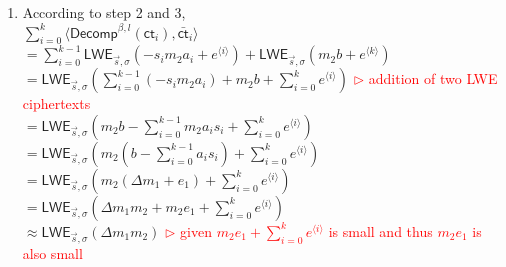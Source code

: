 \begin{myproof}
\begin{enumerate}
$\gap{$\cdots$} + \textsf{LWE}_{\vec{s}, \sigma}\left(-a_{\langle i, l\rangle}s_im_2\dfrac{q}{\beta^l} + a_{\langle i, l \rangle}e_{i,l}\right)\Bigg)$ \\
$= \sum\limits_{i=0}^{k-1}\textsf{LWE}_{\vec{s}, \sigma}\left(-a_{\langle i, 1\rangle}s_im_2\dfrac{q}{\beta^1} -a_{\langle i, 2\rangle}s_im_2\dfrac{q}{\beta^2} + \gap{$\cdots$} -a_{\langle i, l\rangle}s_im_2\dfrac{q}{\beta^l} + a_{\langle i, 1 \rangle}e_{i,1} + \cdots + a_{\langle i, l \rangle}e_{i,l}\right)$ \\
$= \sum\limits_{i=0}^{k-1}\textsf{LWE}_{\vec{s}, \sigma}\left(-s_im_2 \cdot \left(a_{\langle i, 1\rangle}\dfrac{q}{\beta^1} + a_{\langle i, 2\rangle}\dfrac{q}{\beta^2} + \gap{$\cdots$} + a_{\langle i, l\rangle}\dfrac{q}{\beta^l}\right) + a_{\langle i, 1 \rangle}e_{i,1} + \cdots + a_{\langle i, l \rangle}e_{i,l}\right)$ \\
$= \sum\limits_{i=0}^{k-1}\textsf{LWE}_{\vec{s}, \sigma}(-s_im_2a_i + e^{\langle i \rangle})$ \textcolor{red}{ $\rhd$ where $e^{\langle i \rangle} = a_{\langle i, 1 \rangle}e_{i,1} + \cdots + a_{\langle i, l \rangle}e_{i,l}$}
\item According to step 2 and 3, \\
$\sum\limits_{i=0}^{k}\langle \textsf{Decomp}^{\beta, l}(\textsf{ct}_i), \bar{\textsf{ct}}_i \rangle$ \\
$= \sum\limits_{i=0}^{k-1}\textsf{LWE}_{\vec{s}, \sigma}(-s_im_2a_i + e^{\langle i \rangle}) + \textsf{LWE}_{\vec{s}, \sigma} (m_{2}b + e^{\langle k \rangle})$ \\ 
$= \textsf{LWE}_{\vec{s}, \sigma}\left(\sum\limits_{i=0}^{k-1}(-s_im_2a_i) + m_{2}b + \sum\limits_{i=0}^ke^{\langle i \rangle}\right)$ \textcolor{red}{ $\rhd$ addition of two LWE ciphertexts} \\ 
$= \textsf{LWE}_{\vec{s}, \sigma}\left(m_2b - \sum\limits_{i=0}^{k-1}m_2a_is_i + \sum\limits_{i=0}^ke^{\langle i \rangle}\right)$  \\ 
$= \textsf{LWE}_{\vec{s}, \sigma}\left(m_2(b - \sum\limits_{i=0}^{k-1}a_is_i) + \sum\limits_{i=0}^ke^{\langle i \rangle}\right)$\\
$= \textsf{LWE}_{\vec{s}, \sigma}\left(m_2(\Delta m_1 + e_1) + \sum\limits_{i=0}^ke^{\langle i \rangle}\right)$ \\
$= \textsf{LWE}_{\vec{s}, \sigma}\left(\Delta m_1m_2 + m_2e_1 + \sum\limits_{i=0}^ke^{\langle i \rangle}\right)$ \\
$\approx \textsf{LWE}_{\vec{s}, \sigma}(\Delta m_1m_2)$ \textcolor{red}{ $\rhd$ given $m_2e_1 + \sum\limits_{i=0}^ke^{\langle i \rangle}$ is small and thus $m_2e_1$ is also small}
\end{enumerate}

\end{myproof}


